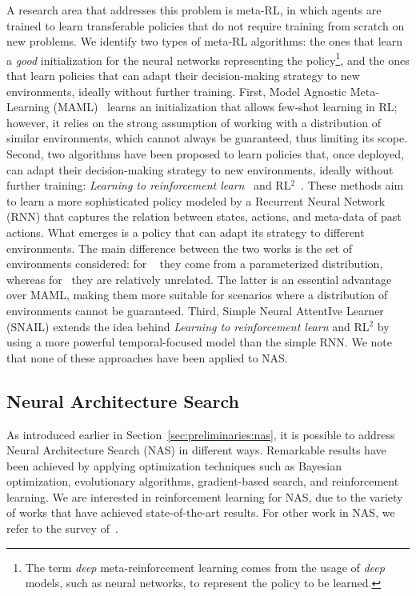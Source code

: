 A research area that addresses this problem is meta-RL, in which agents are trained to learn transferable policies that do not require training from scratch on new problems. We identify two types of meta-RL algorithms: the ones that learn a \textit{good} initialization for the neural networks representing the policy\footnote{The term \textit{deep} meta-reinforcement learning comes from the usage of \textit{deep} models, such as neural networks, to represent the policy to be learned.}, and the ones that learn policies that can adapt their decision-making strategy to new environments, ideally without further training. First, Model Agnostic Meta-Learning (MAML)~\citep{MAML} learns an initialization that allows few-shot learning in RL; however, it relies on the strong assumption of working with a distribution of similar environments, which cannot always be guaranteed, thus limiting its scope. Second, two algorithms have been proposed to learn policies that, once deployed, can adapt their decision-making strategy to new environments, ideally without further training: \textit{Learning to reinforcement learn}~\citep{LtRL} and RL$^2$~\citep{RL2}. These methods aim to learn a more sophisticated policy modeled by a Recurrent Neural Network (RNN) that captures the relation between states, actions, and meta-data of past actions. What emerges is a policy that can adapt its strategy to different environments. The main difference between the two works is the set of environments considered: for ~\citet{LtRL} they come from a parameterized distribution, whereas for~\citet{RL2} they are relatively unrelated. The latter is an essential advantage over MAML, making them more suitable for scenarios where a distribution of environments cannot be guaranteed. Third, Simple Neural AttentIve Learner (SNAIL) extends the idea behind \textit{Learning to reinforcement learn} and RL$^2$ by using a more powerful temporal-focused model than the simple RNN. We note that none of these approaches have been applied to NAS.


\subsection{Neural Architecture Search}\label{sec:related:nas}

As introduced earlier in Section~\ref{sec:preliminaries:nas}, it is possible to address Neural Architecture Search (NAS) in different ways. Remarkable results have been achieved by applying optimization techniques such as Bayesian optimization, evolutionary algorithms, gradient-based search, and reinforcement learning. We are interested in reinforcement learning for NAS, due to the variety of works that have achieved state-of-the-art results.
For other work in NAS, we refer to the survey of~\citet{NASsurvey}.

